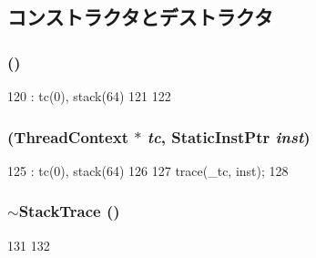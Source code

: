\subsection{コンストラクタとデストラクタ}
\hypertarget{classArmISA_1_1StackTrace_a5a9b2e3bba2262e73b20f87325efd063}{
\subsubsection[{StackTrace}]{ ()}}
\label{classArmISA_1_1StackTrace_a5a9b2e3bba2262e73b20f87325efd063}



\begin{DoxyCode}
120         : tc(0), stack(64)
121     {
122     }
\end{DoxyCode}
\hypertarget{classArmISA_1_1StackTrace_a7c751415d8c87372fc7d24513309cf1b}{
\subsubsection[{StackTrace}]{ ({\bf ThreadContext} $\ast$ {\em tc}, \/  {\bf StaticInstPtr} {\em inst})}}
\label{classArmISA_1_1StackTrace_a7c751415d8c87372fc7d24513309cf1b}



\begin{DoxyCode}
125         : tc(0), stack(64)
126     {
127         trace(_tc, inst);
128     }
\end{DoxyCode}
\hypertarget{classArmISA_1_1StackTrace_adec953886bb73db4f2ec91ed12810135}{
\subsubsection[{$\sim$StackTrace}]{\setlength{\rightskip}{0pt plus 5cm}$\sim${\bf StackTrace} ()}}
\label{classArmISA_1_1StackTrace_adec953886bb73db4f2ec91ed12810135}



\begin{DoxyCode}
131     {
132     }
\end{DoxyCode}



